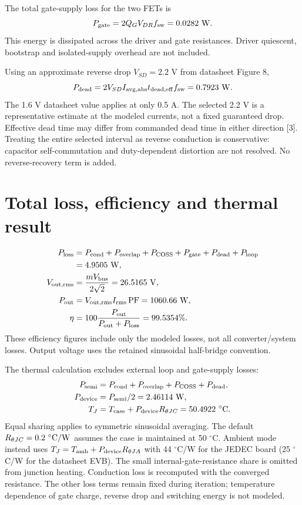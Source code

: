 \documentclass[11pt,a4paper]{article}
\begin{document}
The total gate-supply loss for the two FETs is
\[
 P_{\rm gate}=2Q_GV_{DR}f_{\rm sw}=0.0282\ {\rm W}.
\]
This energy is dissipated across the driver and gate resistances. Driver quiescent,
bootstrap and isolated-supply overhead are not included.

Using an approximate reverse drop $V_{SD}=2.2$ V from datasheet Figure 8,
\[
 P_{\rm dead}=2V_{SD}I_{\rm avg,abs}t_{\rm dead,eff}f_{\rm sw}=0.7923\ {\rm W}.
\]
The 1.6 V datasheet value applies at only 0.5 A. The selected 2.2 V is a representative
estimate at the modeled currents, not a fixed guaranteed drop. Effective dead time
may differ from commanded dead time in either direction [3]. Treating the entire
selected interval as reverse conduction is conservative: capacitor self-commutation
and duty-dependent distortion are not resolved. No reverse-recovery term is added.

\section{Total loss, efficiency and thermal result}
\begin{align*}
 P_{\rm loss}&=P_{\rm cond}+P_{\rm overlap}+P_{\rm COSS}
                 +P_{\rm gate}+P_{\rm dead}+P_{\rm loop}\\
             &=4.9505\ {\rm W},\\
 V_{\rm out,rms}&=\frac{mV_{\rm bus}}{2\sqrt{2}}=26.5165\ {\rm V},\\
 P_{\rm out}&=V_{\rm out,rms}I_{\rm rms}\,\mathrm{PF}=1060.66\ {\rm W},\\
 \eta&=100\frac{P_{\rm out}}{P_{\rm out}+P_{\rm loss}}=99.5354\%.
\end{align*}
These efficiency figures include only the modeled losses, not all converter/system
losses. Output voltage uses the retained sinusoidal half-bridge convention.

The thermal calculation excludes external loop and gate-supply losses:
\begin{align*}
 P_{\rm semi}&=P_{\rm cond}+P_{\rm overlap}+P_{\rm COSS}+P_{\rm dead},\\
 P_{\rm device}&=P_{\rm semi}/2=2.46114\ {\rm W},\\
 T_J&=T_{\rm case}+P_{\rm device}R_{\theta JC}=50.4922\ {^\circ\rm C}.
\end{align*}
Equal sharing applies to symmetric sinusoidal averaging. The default
$R_{\theta JC}=0.2\ {^\circ\rm C/W}$ assumes the case is maintained at 50 $^\circ$C.
Ambient mode instead uses $T_J=T_{\rm amb}+P_{\rm device}R_{\theta JA}$ with
44 $^\circ$C/W for the JEDEC board (25 $^\circ$C/W for the datasheet EVB).
The small internal-gate-resistance share is omitted from junction heating.
Conduction loss is recomputed with the converged resistance. The other loss terms
remain fixed during iteration; temperature dependence of gate charge, reverse drop
and switching energy is not modeled.
\end{document}
